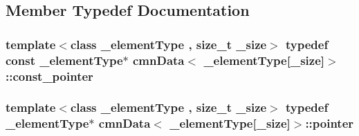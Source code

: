 \subsection{Member Typedef Documentation}
\hypertarget{classcmn_data_3_01__element_type[__size]_4_aaf9e2a181a2500f07b6c99b2bf42477f}{
\subsubsection[{const\-\_\-pointer}]{\setlength{\rightskip}{0pt plus 5cm}template$<$class \-\_\-element\-Type , size\-\_\-t \-\_\-size$>$ typedef const \-\_\-element\-Type$\ast$ {\bf cmn\-Data}$<$ \-\_\-element\-Type\mbox{[}\-\_\-size\mbox{]}$>$\-::{\bf const\-\_\-pointer}}}\label{classcmn_data_3_01__element_type[__size]_4_aaf9e2a181a2500f07b6c99b2bf42477f}
\hypertarget{classcmn_data_3_01__element_type[__size]_4_ad12f77b67872d7ed06978b393bc3d29e}{
\subsubsection[{pointer}]{\setlength{\rightskip}{0pt plus 5cm}template$<$class \-\_\-element\-Type , size\-\_\-t \-\_\-size$>$ typedef \-\_\-element\-Type$\ast$ {\bf cmn\-Data}$<$ \-\_\-element\-Type\mbox{[}\-\_\-size\mbox{]}$>$\-::{\bf pointer}}}\label{classcmn_data_3_01__element_type[__size]_4_ad12f77b67872d7ed06978b393bc3d29e}


